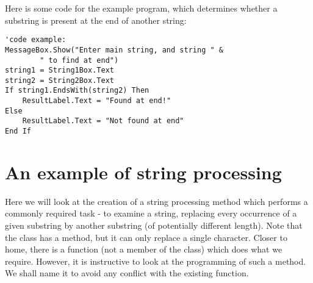 			Here is some code for the example program, which determines whether a substring is present at the end of another string:
			\begin{lstlisting}
'code example:
MessageBox.Show("Enter main string, and string " &
		" to find at end")
string1 = String1Box.Text
string2 = String2Box.Text
If string1.EndsWith(string2) Then
	ResultLabel.Text = "Found at end!"
Else
	ResultLabel.Text = "Not found at end"
End If
			\end{lstlisting}
	

	\section{An example of string processing}
		Here we will look at the creation of a string processing method which performs a commonly required task - to examine a string, replacing every occurrence of a given substring by another substring (of potentially different length). Note that the  class has a  method, but it can only replace a single character. Closer to home, there is a  function (not a member of the  class) which does what we require. However, it is instructive to look at the programming of such a method. We shall name it  to avoid any conflict with the existing  function.
		
